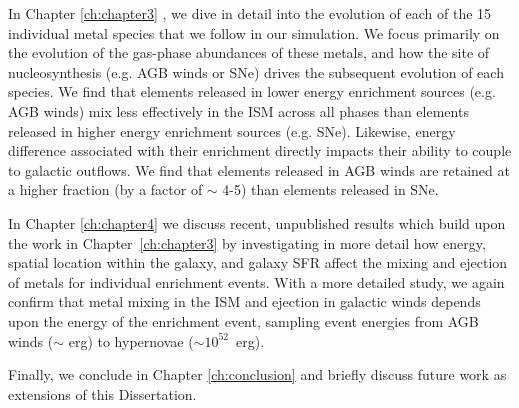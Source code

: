 In Chapter \ref{ch:chapter3} \citep[published as ][]{Emerick2018b}, we dive in detail into the evolution of each of the 15 individual metal species that we follow in our simulation. We focus primarily on the evolution of the gas-phase abundances of these metals, and how the site of nucleosynthesis (e.g. AGB winds or SNe) drives the subsequent evolution of each species. We find that elements released in lower energy enrichment sources (e.g. AGB winds) mix less effectively in the ISM across all phases than elements released in higher energy enrichment sources (e.g. SNe). Likewise, energy difference associated with their enrichment directly impacts their ability to couple to galactic outflows. We find that elements released in AGB winds are retained at a higher fraction (by a factor of $\sim$ 4-5) than elements released in SNe. 

In Chapter \ref{ch:chapter4} we discuss recent, unpublished results which build upon the work in Chapter~\ref{ch:chapter3} by investigating in more detail how energy, spatial location within the galaxy, and galaxy SFR affect the mixing and ejection of metals for individual enrichment events. With a more detailed study, we again confirm that metal mixing in the ISM and ejection in galactic winds depends upon the energy of the enrichment event, sampling event energies from AGB winds ($\sim$ erg) to hypernovae ($\sim 10^{52}$~erg).

Finally, we conclude in Chapter \ref{ch:conclusion} and briefly discuss future work as extensions of this Dissertation.
